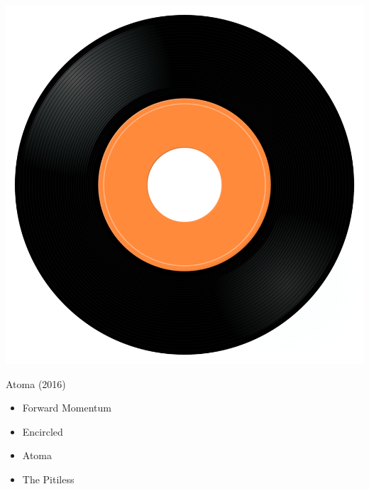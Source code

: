 \begin{minipage}[t]{0.25\textwidth}\vspace{0pt}
\captionsetup{type=figure}
\includegraphics[width=\textwidth]{Images/cover.png}
\caption*{Atoma (2016)}
\end{minipage}
\begin{minipage}[t]{0.25\textwidth}\vspace{0pt}
\begin{itemize}[nosep,leftmargin=1em,labelwidth=*,align=left]
	\setlength{\itemsep}{0pt}
	\item Forward Momentum
	\item Encircled
	\item Atoma
	\item The Pitiless
\end{itemize}

\end{minipage}
